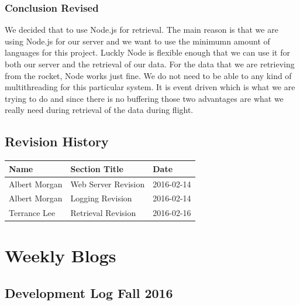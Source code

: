 \documentclass[10pt,draftclsnofoot,onecolumn]{IEEEtran}
\begin{document}
	\subsubsection{Conclusion Revised}
	We decided that to use Node.js for retrieval.  The main reason is that we are using Node.js for our server and we want to use
	the minimumn amount of languages for this project.  Luckly Node is flexible enough that we can use it for both our server and
	the retrieval of our data.  For the data that we are retrieving from the rocket, Node works just fine.  We do not need to be 
	able to any kind of multithreading for this particular system. It is event driven which is what we are trying to do and since
	there is no buffering those two advantages are what we really need during retrieval of the data during flight.
	
	
	\subsection*{Revision History}

	\begin{tabular}{l | l | l}
	Name & Section Title & Date\\ \hline
	Albert Morgan & Web Server Revision & 2016-02-14\\
	Albert Morgan & Logging Revision & 2016-02-14\\
	Terrance Lee & Retrieval Revision & 2016-02-16\\
	\end{tabular}




























\newpage
\section{Weekly Blogs}


\subsection{Development Log Fall 2016}
\end{document}
